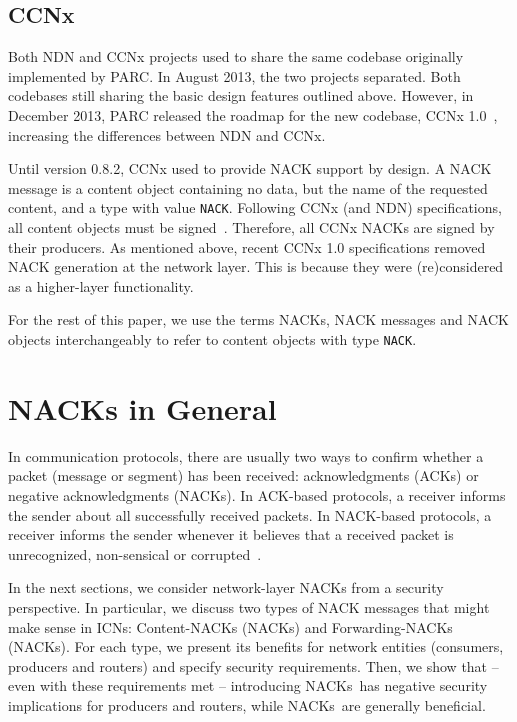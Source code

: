 \documentclass[conference]{IEEEtran}
\newcommand{\cnacks}{\mbox{\sf {\cal c}NACK}s}
\newcommand{\fnacks}{\mbox{\sf {\cal f}NACK}s}
\begin{document}
\subsection{CCNx}
Both NDN and CCNx projects used to share the same codebase originally implemented by PARC. In August 
2013, the two projects separated. Both codebases still sharing the basic design features outlined above. However, in December 2013, 
PARC released the roadmap for the new codebase, CCNx 1.0~\cite{mosko2013ccnx}, increasing the 
differences between NDN and CCNx.

Until version 0.8.2, CCNx used to provide NACK support by design. A NACK message is a content 
object containing no data, but the name of the requested content, and a type with value \texttt{NACK}. 
Following CCNx (and NDN) specifications, all content objects must be signed~\cite{zhang2010named}. Therefore, 
all CCNx NACKs are signed by their producers. As mentioned above, recent CCNx 1.0 specifications 
removed NACK generation at the network layer. This is because they were (re)considered as a higher-layer 
functionality.

For the rest of this paper, we use the terms NACKs, NACK messages and NACK objects interchangeably to 
refer to content objects with type \texttt{NACK}.


\section{NACKs in General}
\label{sec:general-nack}
In communication protocols, there are usually two 
ways to confirm whether a packet (message or segment) has been received: 
acknowledgments (ACKs) or negative acknowledgments (NACKs). In ACK-based protocols, 
a receiver informs the sender about all successfully received packets. In NACK-based protocols, 
a receiver informs the sender whenever it believes that a received packet is unrecognized, non-sensical or 
corrupted~\cite{tanenbaum2010computer}.


In the next sections, we consider network-layer NACKs from a security perspective. In particular, we discuss two 
types of NACK messages that might make sense in ICNs: Content-NACKs (\cnacks) and 
Forwarding-NACKs (\fnacks). For each type, we 
present its benefits for network entities (consumers, producers and routers) and specify security 
requirements. Then, we show that -- even with these requirements met -- introducing \cnacks\  
has negative security implications for producers and routers, while \fnacks\ are generally 
beneficial.
\end{document}
